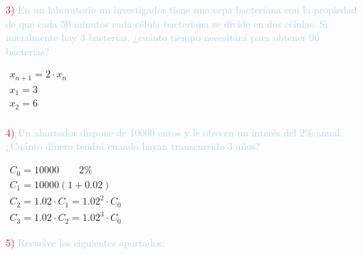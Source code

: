 \textcolor{red}{3) }\textcolor{lightblue}{En un laboratorio un investigador tiene una cepa bacteriana con la propiedad de que cada 50 minutos cada célula bacteriana se divide en dos células. Si inicialmente hay 3 bacterias, ¿cuánto tiempo necesitará para obtener 96 bacterias?}

$\begin{array}{l}
	x_{n+1}=2\cdot x_n\\
	x_1=3\\
	x_2=6\\
	
\end{array}$

\textcolor{red}{4)} \textcolor{lightblue}{Un ahorrador dispone de 10000 euros y le ofrecen un interés del 2\% anual. ¿Cuánto dinero tendrá cuando hayan transcurrido 3 años?}

$\begin{array}{l}
	C_0=10000 \qquad 2\%\\
	C_1=10000(1+0.02)\\
	C_2=1.02\cdot C_1=1.02^2 \cdot C_0\\
	C_3=1.02\cdot C_2=1.02^3\cdot C_0
\end{array}$

\textcolor{red}{5) }\textcolor{lightblue}{Resuelve los siguientes apartados:}

